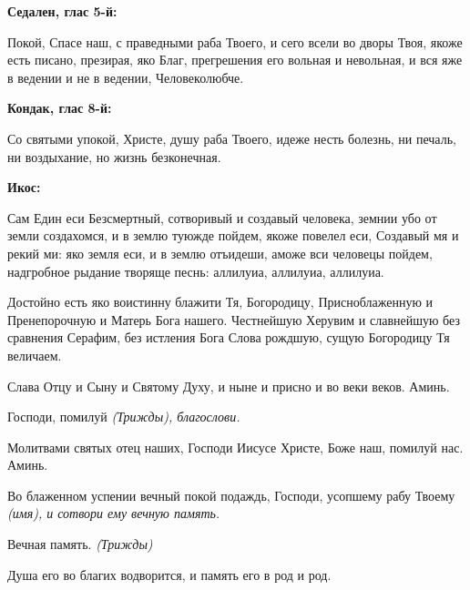  

\bfseries Седален, глас 5-й:\normalfont{}


   Покой, Спасе наш, с праведными раба Твоего, и сего всели во дворы
Твоя, якоже есть писано, презирая, яко Благ, прегрешения его вольная и
невольная, и вся яже в ведении и не в ведении, Человеколюбче.




 

\bfseries Кондак, глас 8-й:\normalfont{}


   Со святыми упокой, Христе, душу раба Твоего, идеже несть болезнь, ни
печаль, ни воздыхание, но жизнь безконечная.



 

\bfseries Икос:\normalfont{}


   Сам Един еси Безсмертный, сотворивый и создавый человека, земнии убо
от земли создахомся, и в землю туюжде пойдем, якоже повелел еси,
Создавый мя и рекий ми: яко земля еси, и в землю отъидеши, аможе вси
человецы пойдем, надгробное рыдание творяще песнь: аллилуиа, аллилуиа,
аллилуиа.



   Достойно есть яко воистинну блажити Тя, Богородицу, Присноблаженную и
Пренепорочную и Матерь Бога нашего. Честнейшую Херувим и славнейшую
без сравнения Серафим, без истления Бога Слова рождшую, сущую
Богородицу Тя величаем.



   Слава Отцу и Сыну и Святому Духу, и ныне и присно и во веки веков.
Аминь.



   Господи, помилуй \itshape (Трижды)\normalfont{}, благослови.



   Молитвами святых отец наших, Господи Иисусе Христе, Боже наш,
помилуй нас. Аминь.



   Во блаженном успении вечный покой подаждь, Господи, усопшему рабу
Твоему \itshape (имя)\normalfont{}, и сотвори ему вечную память.



   Вечная память. \itshape (Трижды)\normalfont{}



   Душа его во благих водворится, и память его в род и род.

   

\mychapterending

 


